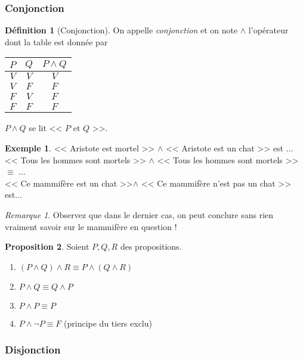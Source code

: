 \documentclass[11pt]{article}
\theoremstyle{definition}
\newtheorem{defn}{Définition}[section]
\newtheorem{prop}[defn]{Proposition}
\newtheorem{exe}{Exemple}
\theoremstyle{remark}
\newtheorem{rem}{Remarque}
\begin{document}
\subsubsection{Conjonction}

\begin{defn}[Conjonction]
On appelle \textit{conjonction} et on note $\land$ l'opérateur dont la table est donnée par

\begin{table}[!ht]
\centering
\begin{tabular}{|c|c|c|}\hline
$P$ & $Q$ & $P\land Q$ \\ \hline
$V$ & $V$ & $V$ \\\hline
$V$ & $F$ & $F$ \\\hline
$F$ & $V$ & $F$ \\\hline
$F$ & $F$ & $F$ \\\hline
\end{tabular}
\end{table}

$P\land Q$ se lit << $P$ et $Q$ >>.
\end{defn}

\begin{exe}
<< Aristote est mortel >> $\land$ << Aristote est un chat >> est ...\\
<< Tous les hommes sont mortels >> $\land$ << Tous les hommes sont mortels >> $\equiv$ ...\\
<< Ce mammifère est un chat >>$\land $ << Ce mammifère n'est pas un chat >> est...
\end{exe}

\begin{rem} Observez que dans le dernier cas, on peut conclure sans rien vraiment savoir sur le mammifère en question !
\end{rem}

\begin{prop}
Soient $P,Q,R$ des propositions.
\begin{enumerate}
\item $(P\land Q)\land R \equiv P\land (Q\land R)$
\item $P\land Q \equiv Q\land P$
\item $P\land P\equiv P$
\item $P\land \neg P \equiv F$ (principe du tiers exclu)
\end{enumerate}

\end{prop}



\subsubsection{Disjonction}
\end{document}
